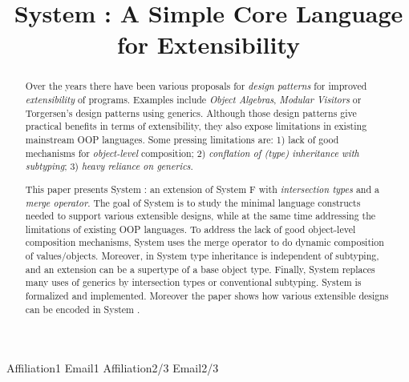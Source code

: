 \documentclass[times,10pt]{sigplanconf}
\begin{document}
\setlength{\pdfpageheight}{\paperheight}
\setlength{\pdfpagewidth}{\paperwidth}


\preprintfooter{\name}                        %

\title{System \name: A Simple Core Language for Extensibility}

           {Affiliation1}
           {Email1}
           {Affiliation2/3}
           {Email2/3}

\maketitle

\begin{abstract}
  
  Over the years there have been various proposals for \emph{design
    patterns} for improved \emph{extensibility} of programs.
  Examples include \emph{Object Algebras}, \emph{Modular Visitors} or
  Torgersen's design patterns using generics.
  Although those design patterns give practical
  benefits in terms of extensibility, they also expose limitations in
  existing mainstream OOP languages. Some pressing
  limitations are: 1) lack of good mechanisms for
  \emph{object-level} composition; 2) \emph{conflation of 
    (type) inheritance with subtyping}; 3) \emph{heavy reliance on generics}.

  This paper presents System \name: an extension of System F with
  \emph{intersection types} and a \emph{merge operator}.  The goal of System \name
  is to study the minimal language constructs needed to support
  various extensible designs, while at the same time addressing the
  limitations of existing OOP languages. To address the lack of good
  object-level composition mechanisms, System \name uses the merge
  operator to do dynamic composition of values/objects. Moreover, in
  System \name type inheritance is independent of subtyping, and an
  extension can be a supertype of a base object type.  Finally, System
  \name replaces many uses of generics by intersection types or
  conventional subtyping. System \name is formalized and
  implemented. Moreover the paper shows how various extensible designs
  can be encoded in System \name.

\end{abstract}
\end{document}
